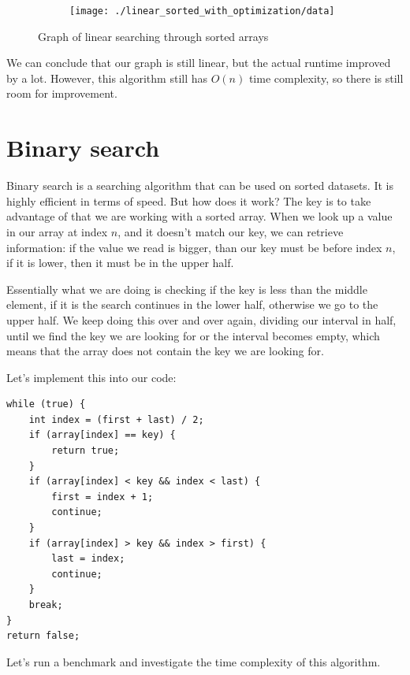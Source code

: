 \documentclass[a4paper,11pt]{article}
\begin{document}
    \begin{figure}[h]
        \centering
        \begin{subfigure}[b]{.5\textwidth}
            \centering
            \texttt{[image: ./linear\_sorted\_with\_optimization/data]} %
        \end{subfigure}
        \caption{Graph of linear searching through sorted arrays}
        \label{fig:graph_2}
    \end{figure}

    We can conclude that our graph is still linear, but the actual runtime improved by a lot.
    However, this algorithm still has $O(n)$ time complexity, so there is still room for improvement.

    \section*{Binary search}

    Binary search is a searching algorithm that can be used on sorted datasets.
    It is highly efficient in terms of speed.
    But how does it work?
    The key is to take advantage of that we are working with a sorted array.
    When we look up a value in our array at index $n$, and it doesn't match our key, we can retrieve information: if the value we read is bigger, than our key must be before index $n$, if it is lower, then it must be in the upper half.

    Essentially what we are doing is checking if the key is less than the middle element, if it is the search continues in the lower half, otherwise we go to the upper half.
    We keep doing this over and over again, dividing our interval in half, until we find the key we are looking for or the interval becomes empty, which means  that the array does not contain the key we are looking for.

    Let's implement this into our code:

    \begin{verbatim}
while (true) {
    int index = (first + last) / 2;
    if (array[index] == key) {
        return true;
    }
    if (array[index] < key && index < last) {
        first = index + 1;
        continue;
    }
    if (array[index] > key && index > first) {
        last = index;
        continue;
    }
    break;
}
return false;
    \end{verbatim}

    Let's run a benchmark and investigate the time complexity of this algorithm.
\end{document}
